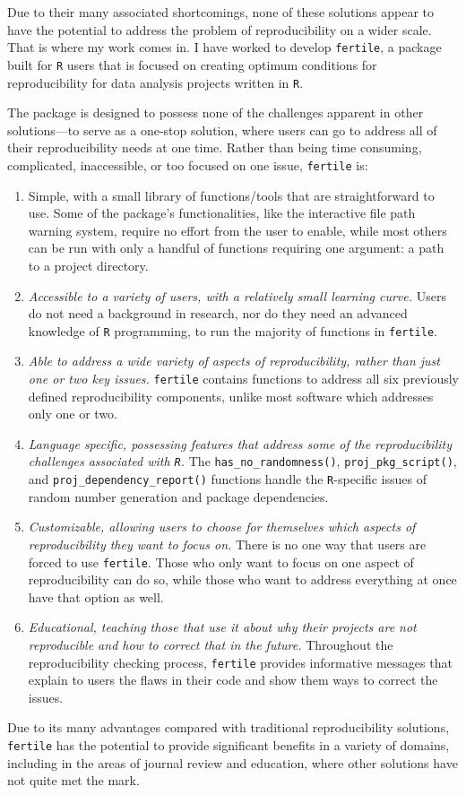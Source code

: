 \documentclass[12pt,twoside]{reedthesis}
\begin{document}
Due to their many associated shortcomings, none of these solutions
appear to have the potential to address the problem of reproducibility
on a wider scale. That is where my work comes in. I have worked to
develop \texttt{fertile}, a package built for \texttt{R} users that is
focused on creating optimum conditions for reproducibility for data
analysis projects written in \texttt{R}.

The package is designed to possess none of the challenges apparent in
other solutions---to serve as a one-stop solution, where users can go to
address all of their reproducibility needs at one time. Rather than
being time consuming, complicated, inaccessible, or too focused on one
issue, \texttt{fertile} is:
\begin{enumerate}
\def\labelenumi{\arabic{enumi})}
\item
  Simple, with a small library of functions/tools that are
  straightforward to use. Some of the package's functionalities, like
  the interactive file path warning system, require no effort from the
  user to enable, while most others can be run with only a handful of
  functions requiring one argument: a path to a project directory.
\item
  \emph{Accessible to a variety of users, with a relatively small
  learning curve.} Users do not need a background in research, nor do
  they need an advanced knowledge of \texttt{R} programming, to run the
  majority of functions in \texttt{fertile}.
\item
  \emph{Able to address a wide variety of aspects of reproducibility,
  rather than just one or two key issues.} \texttt{fertile} contains
  functions to address all six previously defined reproducibility
  components, unlike most software which addresses only one or two.
\item
  \emph{Language specific, possessing features that address some of the
  reproducibility challenges associated with \texttt{R}.} The
  \texttt{has\_no\_randomness()}, \texttt{proj\_pkg\_script()}, and
  \texttt{proj\_dependency\_report()} functions handle the
  \texttt{R}-specific issues of random number generation and package
  dependencies.
\item
  \emph{Customizable, allowing users to choose for themselves which
  aspects of reproducibility they want to focus on.} There is no one way
  that users are forced to use \texttt{fertile}. Those who only want to
  focus on one aspect of reproducibility can do so, while those who want
  to address everything at once have that option as well.
\item
  \emph{Educational, teaching those that use it about why their projects
  are not reproducible and how to correct that in the future.}
  Throughout the reproducibility checking process, \texttt{fertile}
  provides informative messages that explain to users the flaws in their
  code and show them ways to correct the issues.
\end{enumerate}
Due to its many advantages compared with traditional reproducibility
solutions, \texttt{fertile} has the potential to provide significant
benefits in a variety of domains, including in the areas of journal
review and education, where other solutions have not quite met the mark.
\end{document}
